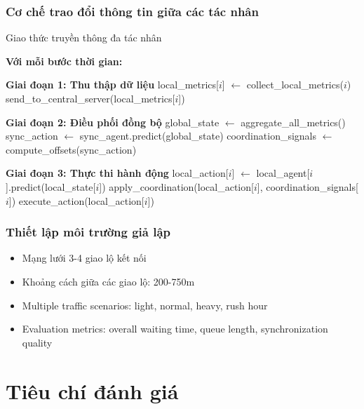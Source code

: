 \subsubsection{Cơ chế trao đổi thông tin giữa các tác nhân}
\begin{algorithm}[!htp]
    \caption{Giao thức truyền thông đa tác nhân}
    \begin{algorithmic}[1] 
        \State \textbf{Với mỗi bước thời gian:}
        
        \State \textbf{Giai đoạn 1: Thu thập dữ liệu}
            \State local\_metrics[$i$] $\leftarrow$ collect\_local\_metrics($i$)
            \State send\_to\_central\_server(local\_metrics[$i$]) 
        \EndFor
        
        \State \textbf{Giai đoạn 2: Điều phối đồng bộ}
        \State global\_state $\leftarrow$ aggregate\_all\_metrics()
        \State sync\_action $\leftarrow$ sync\_agent.predict(global\_state) 
        \State coordination\_signals $\leftarrow$ compute\_offsets(sync\_action)
        
        \State \textbf{Giai đoạn 3: Thực thi hành động} 
            \State local\_action[$i$] $\leftarrow$ local\_agent[$i$].predict(local\_state[$i$]) 
            \State apply\_coordination(local\_action[$i$], coordination\_signals[$i$]) 
            \State execute\_action(local\_action[$i$]) 
        \EndFor
    \end{algorithmic}
\end{algorithm}

\subsubsection{Thiết lập môi trường giả lập}
\begin{itemize}
    \item Mạng lưới 3-4 giao lộ kết nối

    \item Khoảng cách giữa các giao lộ: 200-750m

    \item Multiple traffic scenarios: light, normal, heavy, rush hour

    \item Evaluation metrics: overall waiting time, queue length,
        synchronization quality
\end{itemize}

\section{Tiêu chí đánh giá}

